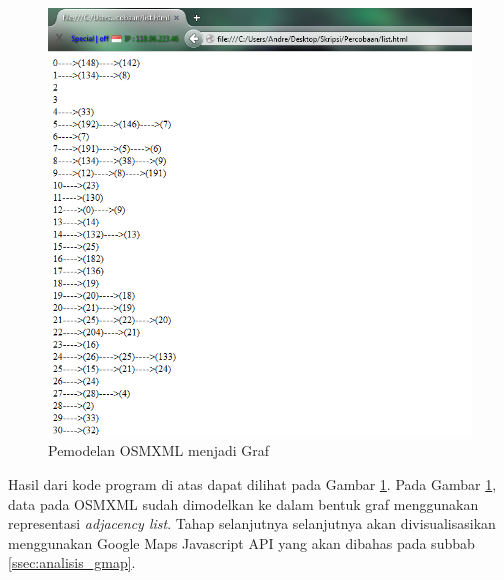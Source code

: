\begin{figure}[h]
\centering
\includegraphics[scale=0.5]{Gambar/graf_analisis}
\caption[Pemodelan OSMXML menjadi Graf]{Pemodelan OSMXML menjadi Graf}
\label{fig:graf_analisis}
\end{figure}
Hasil dari kode program di atas dapat dilihat pada Gambar
\ref{fig:graf_analisis}.
Pada Gambar \ref{fig:graf_analisis}, data pada OSMXML sudah dimodelkan ke dalam
bentuk graf menggunakan representasi \textit{adjacency list}. Tahap selanjutnya
selanjutnya akan divisualisasikan menggunakan Google Maps Javascript API yang 
akan dibahas pada subbab \ref{ssec:analisis_gmap}.

